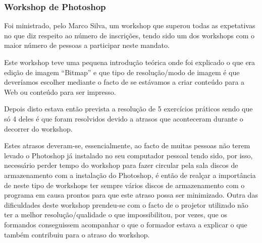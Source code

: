 
\subsubsection{Workshop de Photoshop}

Foi ministrado, pelo Marco Silva, um workshop que superou todas as expetativas no que diz respeito ao número de inscrições, tendo sido um dos workshops com o maior número de pessoas a participar neste mandato.

Este workshop teve uma pequena introdução teórica onde foi explicado o que era edição de imagem “Bitmap” e que tipo de resolução/modo de imagem é que deveríamos escolher mediante o facto de se estávamos a criar conteúdo para a Web ou conteúdo para ser impresso.

Depois disto estava então prevista a resolução de 5 exercícios práticos sendo que só 4 deles é que foram resolvidos devido a atrasos que aconteceram durante o decorrer do workshop.

Estes atrasos deveram-se, essencialmente, ao facto de muitas pessoas não terem levado o Photoshop já instalado no seu computador pessoal tendo sido, por isso, necessário perder tempo do workshop para fazer circular pela sala discos de armazenamento com a instalação do Photoshop, é então de realçar a importância de neste tipo de workshops ter sempre vários discos de armazenamento com o programa em causa prontos para que este atraso possa ser minimizado. Outra das dificuldades deste workshop prendeu-se com o facto de o projetor utilizado não ter a melhor resolução/qualidade o que impossibilitou, por vezes, que os formandos conseguissem acompanhar o que o formador estava a explicar o que também contribuiu para o atraso do workshop.